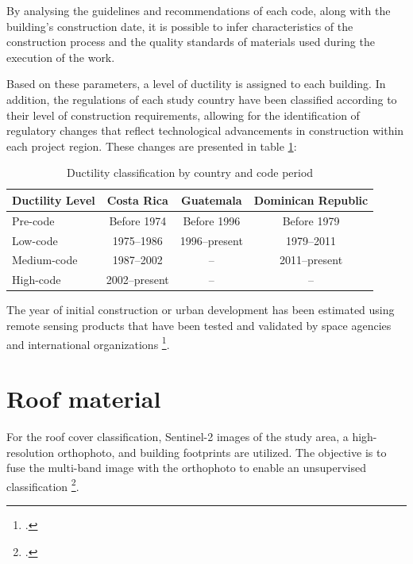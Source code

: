 \begin{refsection}
By analysing the guidelines and recommendations of each code, along with the building's construction date, it is possible to infer characteristics of the construction process and the quality standards of materials used during the execution of the work.


Based on these parameters, a level of ductility is assigned to each building. In addition, the regulations of each study country have been classified according to their level of construction requirements, allowing for the identification of regulatory changes that reflect technological advancements in construction within each project region. These changes are presented in table \ref{tab:ductility_year}:

\begin{table}[h]
    \centering
    \caption{Ductility classification by country and code period}
    \begin{tabular}{|l|c|c|c|}
        \hline
        \textbf{Ductility Level} & \textbf{Costa Rica} & \textbf{Guatemala} & \textbf{Dominican Republic} \\
        \hline
        Pre-code & Before 1974 & Before 1996 & Before 1979 \\
        \hline
        Low-code & 1975--1986 & 1996--present & 1979--2011 \\
        \hline
        Medium-code & 1987--2002 & -- & 2011--present \\
        \hline
        High-code & 2002--present & -- & -- \\
        \hline
    \end{tabular}
    \label{tab:ductility_year}
\end{table}

The year of initial construction or urban development has been estimated using remote sensing products that have been tested and validated by space agencies and international organizations \footcite{pesaresi_advances_2024, marconcini_outlining_2020, marconcini_understanding_2021}. 


\renewcommand{\sectionnametext}{Roof material}
\renewcommand{\headingtextR}{\thesection. \sectionnametext}
\section{\sectionnametext}

For the roof cover classification, Sentinel-2 images of the study area, a high-resolution orthophoto, and building footprints are utilized. The objective is to fuse the multi-band image with the orthophoto to enable an unsupervised classification \footcite{braun_identification_2019}.


\end{refsection}
